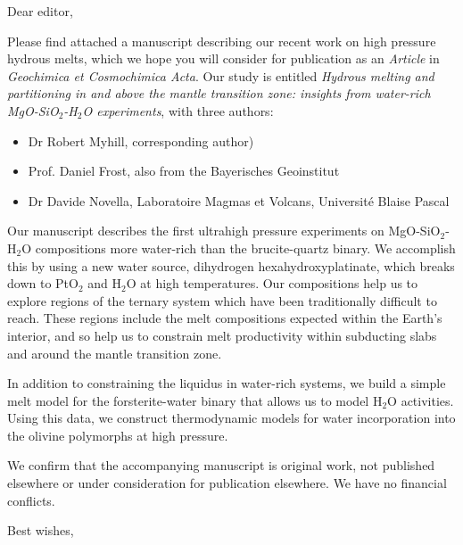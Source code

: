 \documentclass[10pt]{letter}
\date{\today}
\begin{document}
\begin{letter}{}
                           
\opening{Dear editor,}

Please find attached a manuscript describing our recent work on high pressure hydrous melts, which we hope you will consider for publication as an \emph{Article} in \emph{Geochimica et Cosmochimica Acta}. Our study is entitled \emph{Hydrous melting and partitioning in and above the mantle transition zone: insights from water-rich MgO-SiO$_2$-H$_2$O experiments}, with three authors:

\begin{itemize}
\item Dr Robert Myhill, corresponding author)
\item Prof. Daniel Frost, also from the Bayerisches Geoinstitut
\item Dr Davide Novella, Laboratoire Magmas et Volcans, Universit\'{e} Blaise Pascal
\end{itemize}


Our manuscript describes the first ultrahigh pressure experiments on MgO-SiO$_2$-H$_2$O compositions more water-rich than the brucite-quartz binary. We accomplish this by using a new water source, dihydrogen hexahydroxyplatinate, which breaks down to PtO$_2$ and H$_2$O at high temperatures. Our compositions help us to explore regions of the ternary system which have been traditionally difficult to reach. These regions include the melt compositions expected within the Earth's interior, and so help us to constrain melt productivity within subducting slabs and around the mantle transition zone.

In addition to constraining the liquidus in water-rich systems, we build a simple melt model for the forsterite-water binary that allows us to model H$_2$O activities. Using this data, we construct thermodynamic models for water incorporation into the olivine polymorphs at high pressure.


We confirm that the accompanying manuscript is original work, not published elsewhere or under consideration for publication elsewhere. We have no financial conflicts. 


\closing{Best wishes,}

\end{letter}
\end{document}
